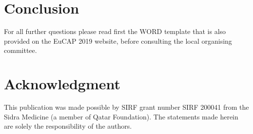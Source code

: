 \documentclass[conference,a4paper]{IEEEtran}
\begin{document}
%




\vspace{7pt}
\section{Conclusion}
For all further questions please read first the WORD template that is also provided on the EuCAP 2019 website, before consulting the local organising committee.






\vspace{7pt}
\section*{Acknowledgment}
% 
This publication was made possible by SIRF grant number SIRF 200041 from the
Sidra Medicine (a member of Qatar Foundation). The statements made herein are solely the responsibility of the authors.
\end{document}
